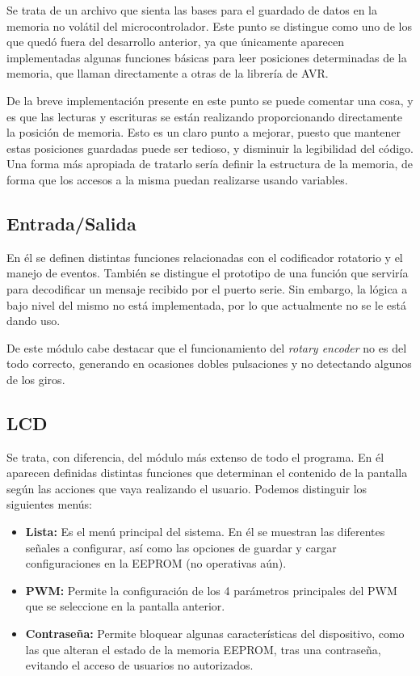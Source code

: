 Se trata de un archivo que sienta las bases para el guardado de datos en la memoria no volátil del microcontrolador. Este punto se distingue como uno de los que quedó fuera del desarrollo anterior, ya que únicamente aparecen implementadas algunas funciones básicas para leer posiciones determinadas de la memoria, que llaman directamente a otras de la librería de AVR.

De la breve implementación presente en este punto se puede comentar una cosa, y es que las lecturas y escrituras se están realizando proporcionando directamente la posición de memoria. Esto es un claro punto a mejorar, puesto que mantener estas posiciones guardadas puede ser tedioso, y disminuir la legibilidad del código. Una forma más apropiada de tratarlo sería definir la estructura de la memoria, de forma que los accesos a la misma puedan realizarse usando variables.

\subsection{Entrada/Salida}

En él se definen distintas funciones relacionadas con el codificador rotatorio y el manejo de eventos. También se distingue el prototipo de una función que serviría para decodificar un mensaje recibido por el puerto serie. Sin embargo, la lógica a bajo nivel del mismo no está implementada, por lo que actualmente no se le está dando uso.

De este módulo cabe destacar que el funcionamiento del \textit{rotary encoder} no es del todo correcto, generando en ocasiones dobles pulsaciones y no detectando algunos de los giros.

\subsection{LCD}

Se trata, con diferencia, del módulo más extenso de todo el programa. En él aparecen definidas distintas funciones que determinan el contenido de la pantalla según las acciones que vaya realizando el usuario. Podemos distinguir los siguientes menús:

\begin{itemize}
    \item\textbf{Lista:} Es el menú principal del sistema. En él se muestran las diferentes señales a configurar, así como las opciones de guardar y cargar configuraciones en la EEPROM (no operativas aún).
    \item\textbf{PWM:} Permite la configuración de los 4 parámetros principales del PWM que se seleccione en la pantalla anterior.
    \item\textbf{Contraseña:} Permite bloquear algunas características del dispositivo, como las que alteran el estado de la memoria EEPROM, tras una contraseña, evitando el acceso de usuarios no autorizados.
\end{itemize}

